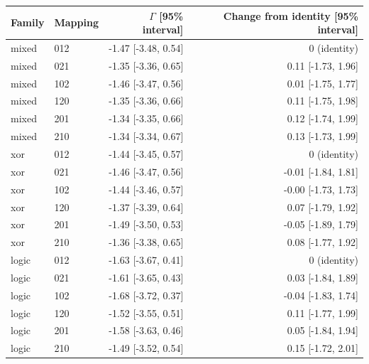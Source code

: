 \begin{tabular}{llrr}
\toprule
Family & Mapping & $\Gamma$ [95\% interval] & Change from identity [95\% interval] \\
\midrule
mixed & 012 & -1.47 [-3.48, 0.54] & 0 (identity) \\
mixed & 021 & -1.35 [-3.36, 0.65] & 0.11 [-1.73, 1.96] \\
mixed & 102 & -1.46 [-3.47, 0.56] & 0.01 [-1.75, 1.77] \\
mixed & 120 & -1.35 [-3.36, 0.66] & 0.11 [-1.75, 1.98] \\
mixed & 201 & -1.34 [-3.35, 0.66] & 0.12 [-1.74, 1.99] \\
mixed & 210 & -1.34 [-3.34, 0.67] & 0.13 [-1.73, 1.99] \\
xor & 012 & -1.44 [-3.45, 0.57] & 0 (identity) \\
xor & 021 & -1.46 [-3.47, 0.56] & -0.01 [-1.84, 1.81] \\
xor & 102 & -1.44 [-3.46, 0.57] & -0.00 [-1.73, 1.73] \\
xor & 120 & -1.37 [-3.39, 0.64] & 0.07 [-1.79, 1.92] \\
xor & 201 & -1.49 [-3.50, 0.53] & -0.05 [-1.89, 1.79] \\
xor & 210 & -1.36 [-3.38, 0.65] & 0.08 [-1.77, 1.92] \\
logic & 012 & -1.63 [-3.67, 0.41] & 0 (identity) \\
logic & 021 & -1.61 [-3.65, 0.43] & 0.03 [-1.84, 1.89] \\
logic & 102 & -1.68 [-3.72, 0.37] & -0.04 [-1.83, 1.74] \\
logic & 120 & -1.52 [-3.55, 0.51] & 0.11 [-1.77, 1.99] \\
logic & 201 & -1.58 [-3.63, 0.46] & 0.05 [-1.84, 1.94] \\
logic & 210 & -1.49 [-3.52, 0.54] & 0.15 [-1.72, 2.01] \\
\bottomrule
\end{tabular}
